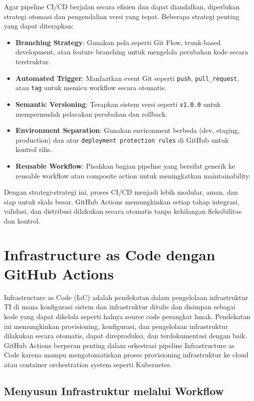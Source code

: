 Agar pipeline CI/CD berjalan secara efisien dan dapat diandalkan, diperlukan strategi otomasi dan pengendalian versi yang tepat. Beberapa strategi penting yang dapat diterapkan:

\begin{itemize}
	\item \textbf{Branching Strategy}: Gunakan pola seperti Git Flow, trunk-based development, atau feature branching untuk mengelola perubahan kode secara terstruktur.
	\item \textbf{Automated Trigger}: Manfaatkan event Git seperti \texttt{push}, \texttt{pull\_request}, atau \texttt{tag} untuk memicu workflow secara otomatis.
	\item \textbf{Semantic Versioning}: Terapkan sistem versi seperti \texttt{v1.0.0} untuk mempermudah pelacakan perubahan dan rollback.
	\item \textbf{Environment Separation}: Gunakan environment berbeda (dev, staging, production) dan atur \texttt{deployment protection rules} di GitHub untuk kontrol rilis.
	\item \textbf{Reusable Workflow}: Pisahkan bagian pipeline yang bersifat generik ke reusable workflow atau composite action untuk meningkatkan maintainability.
\end{itemize}

Dengan strategi-strategi ini, proses CI/CD menjadi lebih modular, aman, dan siap untuk skala besar. GitHub Actions memungkinkan setiap tahap integrasi, validasi, dan distribusi dilakukan secara otomatis tanpa kehilangan fleksibilitas dan kontrol.



\section{Infrastructure as Code dengan GitHub Actions}

Infrastructure as Code (IaC) adalah pendekatan dalam pengelolaan infrastruktur TI di mana konfigurasi sistem dan infrastruktur ditulis dan disimpan sebagai kode yang dapat dikelola seperti halnya source code perangkat lunak. Pendekatan ini memungkinkan provisioning, konfigurasi, dan pengelolaan infrastruktur dilakukan secara otomatis, dapat direproduksi, dan terdokumentasi dengan baik. GitHub Actions berperan penting dalam orkestrasi pipeline Infrastructure as Code karena mampu mengotomatiskan proses provisioning infrastruktur ke cloud atau container orchestration system seperti Kubernetes.

\subsection{Menyusun Infrastruktur melalui Workflow}

